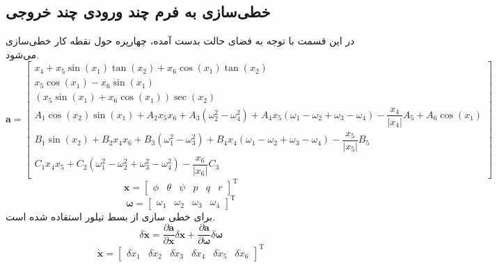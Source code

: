 \subsection{خطی‌سازی به فرم چند ورودی چند خروجی}\label{lin_MIMO}
در این قسمت با توجه به فضای حالت بدست آمده، چهارپره حول نقطه کار خطی‌سازی می‌شود.
\begin{equation*}
	\boldsymbol a = \begin{bmatrix}
		x_4 + x_5\sin(x_1)\tan(x_2) + x_6\cos(x_1)\tan(x_2)\\
		x_5\cos(x_1)- x_6\sin(x_1)\\
		(x_5\sin(x_1) + x_6\cos(x_1))\sec(x_2)\\
		A_1\cos(x_2)\sin(x_1) + 
		A_2x_5x_6 + A_3\left(\omega_2^2-\omega_4^2\right)+
		A_4x_5\left(\omega_1-\omega_2+\omega_3-\omega_4\right)- \dfrac{x_4}{\lvert x_4\rvert}A_5+A_6\cos(x_1)\\
		B_1\sin(x_2) + 
		B_2x_4x_6 + B_3\left(\omega_1^2-\omega_3^2\right)+
		B_4x_4\left(\omega_1-\omega_2+\omega_3-\omega_4\right)- \dfrac{x_5}{\lvert x_5\rvert}B_5\\
		C_1x_4x_5 + 
		C_2\left(\omega_1^2-\omega_2^2+\omega_3^2-\omega_4^2\right)- \dfrac{x_6}{\lvert x_6\rvert}C_3
	\end{bmatrix}
\end{equation*} 
\begin{equation}
	\boldsymbol{x} = \begin{bmatrix} %
		\phi& \theta & \psi & p& q& r
	\end{bmatrix}^\mathrm{T}
\end{equation}
\begin{equation}
	\boldsymbol{\omega} = \begin{bmatrix}
		\omega_1&\omega_2&\omega_3&\omega_4
	\end{bmatrix}^\mathrm{T}
\end{equation}
برای خطی سازی از بسط تیلور استفاده شده ‌است.
\begin{equation}
	\delta \dot{\boldsymbol{x}} = \dfrac{\partial  \boldsymbol a}{\partial  \boldsymbol x}\delta \boldsymbol x + \dfrac{\partial \boldsymbol a}{\partial \boldsymbol \omega}\delta \boldsymbol \omega 
\end{equation}
\begin{equation}
	\dot{\boldsymbol{x}} =
	\begin{bmatrix}
		\delta \dot x_1&
		\delta \dot x_2&
		\delta \dot x_3&
		\delta \dot x_4&
		\delta \dot x_5&
		\delta \dot x_6
	\end{bmatrix}^\mathrm{T}
\end{equation}

